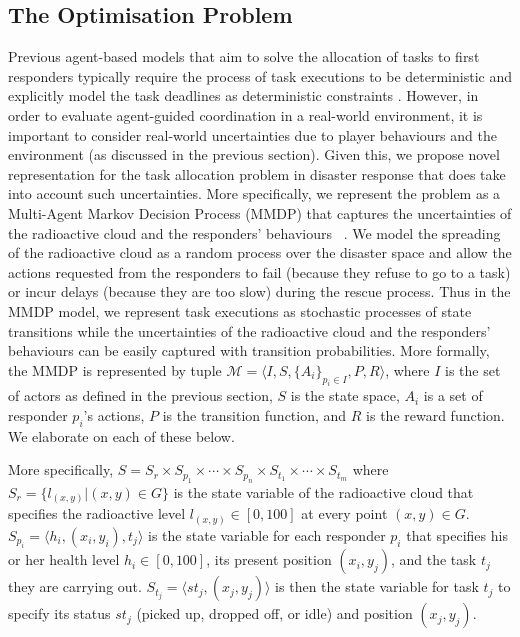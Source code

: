 \subsection{The Optimisation Problem}
\label{sec:model}
\noindent Previous agent-based models that aim to solve the allocation of tasks to first responders typically require the process of task executions to be deterministic and explicitly model the task deadlines as deterministic constraints \cite{ramchurn:etal:2010b,Scerri2005}. However, in order to evaluate agent-guided coordination in a real-world environment, it is important to consider real-world uncertainties due to player behaviours and the environment (as discussed in the previous section). Given this, we propose novel representation for the task allocation problem in disaster response that does take into account such uncertainties. More specifically, we represent the problem as a Multi-Agent Markov Decision Process (MMDP) that captures the uncertainties of the radioactive cloud and the responders' behaviours ~\cite{boutilier1996planning}. We model the spreading of the radioactive cloud as a random process over the disaster space and allow the actions requested from the responders to  fail (because they refuse to go to a  task) or incur delays (because they are too slow) during the rescue process. Thus in the MMDP model, we represent  task executions as stochastic processes of state transitions while the uncertainties of the radioactive cloud and the responders' behaviours can be easily captured with transition probabilities.  More formally, the MMDP is
represented by tuple $\mathcal{M} = \langle I, S, \{A_i\}_{p_i\in I}, P, R
\rangle$, where $I$ is the set of actors as defined in the previous
section,  $S$ is the state space, $A_i$ is a set of responder
$p_i$'s actions, $P$ is the transition function, and $R$ is the
reward function. We elaborate on each of these below.

More specifically, $S= S_r \times S_{p_1} \times \cdots \times
S_{p_n} \times S_{t_1} \times \cdots \times S_{t_m}$ where $S_r =
\{l_{(x,y)}| (x, y) \in G\}$ is the state variable of the
radioactive cloud that specifies the radioactive level $l_{(x,y)}\in[0,
100]$ at every point $(x, y)\in G$. $S_{p_i} = \langle h_i, (x_i,
y_i), t_j \rangle$ is the state variable for each responder $p_i$
that specifies his or her health level $h_i\in[0, 100]$, its present position
$(x_i, y_j)$, and the task $t_j$ they are carrying out. $S_{t_j}
= \langle st_j, (x_j, y_j) \rangle$ is then the state variable for
task $t_j$ to specify its status $st_j$ (picked up, dropped off, or
idle) and position $(x_j, y_j)$.

